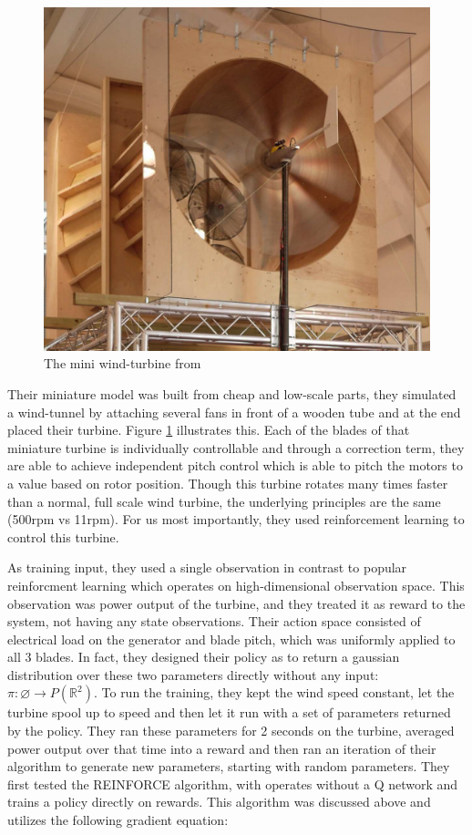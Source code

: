 \documentclass[hyperref,german,beleg]{cgvpub}
\begin{document}
\begin{figure}
  \centering
  \includegraphics[width=0.5\linewidth]{Miniturbine.png}
  \caption{The mini wind-turbine from \cite{kolterDesignAnalysisLearning2012}}
  \label{fig:miniturbine}
\end{figure}

Their miniature model was built from cheap and low-scale parts, they simulated a wind-tunnel by attaching several fans in front of a wooden tube and at the end placed their turbine. Figure \ref{fig:miniturbine} illustrates this. Each of the blades of that miniature turbine is individually controllable and through a correction term, they are able to achieve independent pitch control which is able to pitch the motors to a value based on rotor position. Though this turbine rotates many times faster than a normal, full scale wind turbine, the underlying principles are the same (500rpm vs 11rpm). For us most importantly, they used reinforcement learning to control this turbine.

As training input, they used a single observation in contrast to popular reinforcment learning which operates on high-dimensional observation space. This observation was power output of the turbine, and they treated it as reward to the system, not having any state observations. Their action space consisted of electrical load on the generator and blade pitch, which was uniformly applied to all 3 blades. In fact, they designed their policy as to return a gaussian distribution over these two parameters directly without any input: $\pi: \varnothing \rightarrow P(\mathbb{R}^2)$. To run the training, they kept the wind speed constant, let the turbine spool up to speed and then let it run with a set of parameters returned by the policy. They ran these parameters for 2 seconds on the turbine, averaged power output over that time into a reward and then ran an iteration of their algorithm to generate new parameters, starting with random parameters. 
They first tested the \ac{REINFORCE} algorithm, with operates without a Q network and trains a policy directly on rewards. This algorithm was discussed above and utilizes the following gradient equation:
\end{document}
